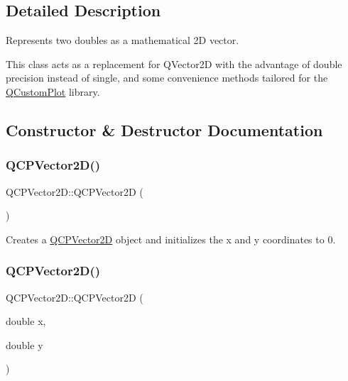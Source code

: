 \subsection{Detailed Description}
Represents two doubles as a mathematical 2D vector. 

This class acts as a replacement for Q\+Vector2D with the advantage of double precision instead of single, and some convenience methods tailored for the \hyperlink{class_q_custom_plot}{Q\+Custom\+Plot} library. 

\subsection{Constructor \& Destructor Documentation}
\mbox{\label{class_q_c_p_vector2_d_a04c90748c3623044c79fa20788ffbcc6}} 
\subsubsection{\texorpdfstring{Q\+C\+P\+Vector2\+D()}{QCPVector2D()}\hspace{0.1cm}{\footnotesize\ttfamily [1/4]}}
{\footnotesize\ttfamily Q\+C\+P\+Vector2\+D\+::\+Q\+C\+P\+Vector2D (\begin{DoxyParamCaption}{ }\end{DoxyParamCaption})}

Creates a \hyperlink{class_q_c_p_vector2_d}{Q\+C\+P\+Vector2D} object and initializes the x and y coordinates to 0. \mbox{\label{class_q_c_p_vector2_d_a47bd86cebc5588dad6ec84349d9098d4}} 
\subsubsection{\texorpdfstring{Q\+C\+P\+Vector2\+D()}{QCPVector2D()}\hspace{0.1cm}{\footnotesize\ttfamily [2/4]}}
{\footnotesize\ttfamily Q\+C\+P\+Vector2\+D\+::\+Q\+C\+P\+Vector2D (\begin{DoxyParamCaption}\item[{double}]{x,  }\item[{double}]{y }\end{DoxyParamCaption})}

